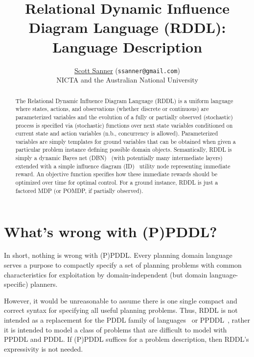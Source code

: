 \documentclass[11pt,a4paper]{article}
\begin{document}
\title{\bf Relational Dynamic Influence Diagram Language (RDDL):
Language Description}
\author{
 \href{http://users.cecs.anu.edu.au/~ssanner/}{Scott Sanner} (\texttt{ssanner@gmail.com}) \\
NICTA and the Australian National University
}
\date{}

\maketitle

\vspace{-5mm}

\begin{abstract}
The Relational Dynamic Influence Diagram Language (RDDL) is a uniform
language where states, actions, and observations (whether discrete or
continuous) are parameterized variables and the
evolution of a fully or partially observed (stochastic) process is
specified via (stochastic) functions over next state variables
conditioned on current state and action variables (n.b.,
concurrency is allowed).  Parameterized variables are simply templates
for ground variables that can be obtained when given a particular
problem instance defining possible domain objects.  Semantically, RDDL
is simply a dynamic Bayes net (DBN)~\cite{dbn} (with potentially many
intermediate layers) extended with a simple influence diagram
(ID)~\cite{influence_diagrams} utility node representing immediate
reward.  An objective function specifies how these immediate rewards
should be optimized over time for optimal control.  For a ground
instance, RDDL is just a factored MDP (or POMDP, if partially
observed).
\end{abstract}

\vspace{-3mm}

\setcounter{tocdepth}{2}
\tableofcontents

\newpage

\section{What's wrong with (P)PDDL?}

In short, nothing is wrong with (P)PDDL.  Every planning domain
language serves a purpose to compactly specify a set of
planning problems with common characteristics for exploitation
by domain-independent (but domain language-specific) planners.

However, it would be unreasonable to assume there is one single
compact and correct syntax for specifying all useful planning
problems.  Thus, RDDL is not intended as a replacement for the PDDL family
of languages~\cite{pddl_family} or PPDDL~\cite{ppddl}, rather it is intended
to model a class of problems that are difficult to model with PPDDL
and PDDL.  If (P)PDDL suffices for a problem description, then
RDDL's expressivity is not needed.
\end{document}
